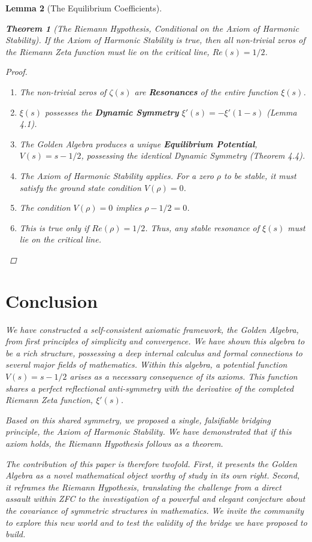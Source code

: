 \documentclass{article}
\theoremstyle{plain}
\newtheorem{theorem}{Theorem}[section]
\newtheorem{lemma}[theorem]{Lemma}
\theoremstyle{definition}
\theoremstyle{remark}
\begin{document}
\begin{lemma}[The Equilibrium Coefficients]
\begin{theorem}[The Riemann Hypothesis, Conditional on the Axiom of Harmonic Stability]
If the Axiom of Harmonic Stability is true, then all non-trivial zeros of the Riemann Zeta function must lie on the critical line, $Re(s)=1/2$.
\end{theorem}
\begin{proof}
\begin{enumerate}
    \item The non-trivial zeros of $\zeta(s)$ are \textbf{Resonances} of the entire function $\xi(s)$.
    \item $\xi(s)$ possesses the \textbf{Dynamic Symmetry} $\xi'(s) = -\xi'(1-s)$ (Lemma 4.1).
    \item The Golden Algebra produces a unique \textbf{Equilibrium Potential}, $V(s) = s - 1/2$, possessing the identical Dynamic Symmetry (Theorem 4.4).
    \item The Axiom of Harmonic Stability applies. For a zero $\rho$ to be stable, it must satisfy the ground state condition $V(\rho)=0$.
    \item The condition $V(\rho)=0$ implies $\rho - 1/2 = 0$.
    \item This is true only if $Re(\rho) = 1/2$. Thus, any stable resonance of $\xi(s)$ must lie on the critical line.
\end{enumerate}
\end{proof}

\section{Conclusion}
We have constructed a self-consistent axiomatic framework, the Golden Algebra, from first principles of simplicity and convergence. We have shown this algebra to be a rich structure, possessing a deep internal calculus and formal connections to several major fields of mathematics. Within this algebra, a potential function $V(s) = s - 1/2$ arises as a necessary consequence of its axioms. This function shares a perfect reflectional anti-symmetry with the derivative of the completed Riemann Zeta function, $\xi'(s)$.

Based on this shared symmetry, we proposed a single, falsifiable bridging principle, the Axiom of Harmonic Stability. We have demonstrated that if this axiom holds, the Riemann Hypothesis follows as a theorem.

The contribution of this paper is therefore twofold. First, it presents the Golden Algebra as a novel mathematical object worthy of study in its own right. Second, it reframes the Riemann Hypothesis, translating the challenge from a direct assault within ZFC to the investigation of a powerful and elegant conjecture about the covariance of symmetric structures in mathematics. We invite the community to explore this new world and to test the validity of the bridge we have proposed to build.


\end{lemma}
\end{document}
